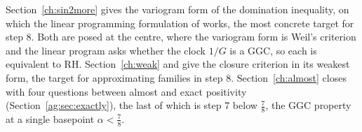 Section~\ref{ch:sin2more} gives the variogram form of the domination inequality, on which the linear programming formulation of \cite[Sections 18.2.8 and 18.2.9]{P26} works, the most concrete target for step 8. Both are posed at the centre, where the variogram form is Weil's criterion and the linear program asks whether the clock $1/G$ is a GGC, so each is equivalent to RH. Section~\ref{ch:weak} and \cite[Section 18.2.3]{P26} give the closure criterion in its weakest form, the target for approximating families in step 8. Section~\ref{ch:almost} closes with four questions between almost and exact positivity (Section~\ref{ag:sec:exactly}), the last of which is step 7 below $\frac78$, the GGC property at a single basepoint $\alpha<\frac78$.
